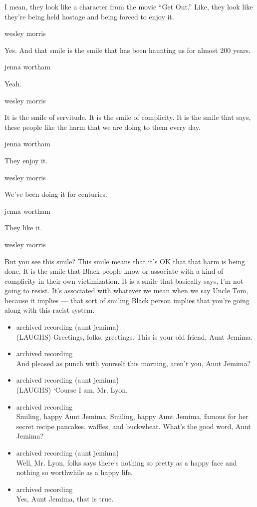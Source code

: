 I mean, they look like a character from the movie ``Get Out.'' Like,
they look like they're being held hostage and being forced to enjoy it.

wesley morris

Yes. And that smile is the smile that has been haunting us for almost
200 years.

jenna wortham

Yeah.

wesley morris

It is the smile of servitude. It is the smile of complicity. It is the
smile that says, these people like the harm that we are doing to them
every day.

jenna wortham

They enjoy it.

wesley morris

We've been doing it for centuries.

jenna wortham

They like it.

wesley morris

But you see this smile? This smile means that it's OK that that harm is
being done. It is the smile that Black people know or associate with a
kind of complicity in their own victimization. It is a smile that
basically says, I'm not going to resist. It's associated with whatever
we mean when we say Uncle Tom, because it implies --- that sort of
smiling Black person implies that you're going along with this racist
system.

\begin{itemize}
\item
  archived recording (aunt jemima)\\
  (LAUGHS) Greetings, folks, greetings. This is your old friend, Aunt
  Jemima.
\item
  archived recording\\
  And pleased as punch with yourself this morning, aren't you, Aunt
  Jemima?
\item
  archived recording (aunt jemima)\\
  (LAUGHS) `Course I am, Mr. Lyon.
\item
  archived recording\\
  Smiling, happy Aunt Jemima. Smiling, happy Aunt Jemima, famous for her
  secret recipe pancakes, waffles, and buckwheat. What's the good word,
  Aunt Jemima?
\item
  archived recording (aunt jemima)\\
  Well, Mr. Lyon, folks says there's nothing so pretty as a happy face
  and nothing so worthwhile as a happy life.
\item
  archived recording\\
  Yes, Aunt Jemima, that is true.
\end{itemize}

